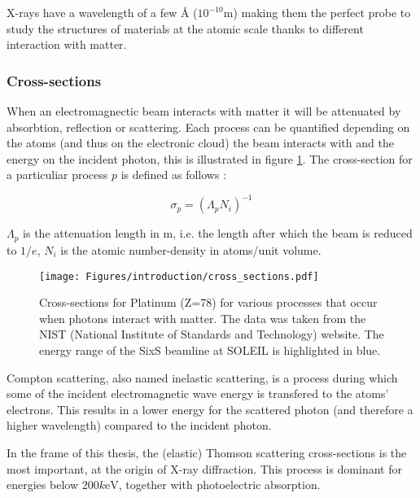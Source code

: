 X-rays have a wavelength of a few \si{\angstrom} ($10^{-10} \si{\meter}$) making them the perfect probe to study the structures of materials at the atomic scale thanks to different interaction with matter.

\subsubsection{Cross-sections}

When an electromagnectic beam interacts with matter it will be attenuated by absorbtion, reflection or scattering.
Each process can be quantified depending on the atoms (and thus on the electronic cloud) the beam interacts with and the energy on the incident photon, this is illustrated in figure \ref{fig:cross_sections}.
The cross-section for a particuliar process $p$ is defined as follows \parencite{Willmott}:

\begin{equation}
	\sigma_p = (\Lambda_p N_i)^{-1}
\end{equation}

$\Lambda_p$ is the attenuation length in \si{\meter}, i.e. the length after which the beam is reduced to $1/e$, $N_i$ is the atomic number-density in atoms/unit volume.

\begin{figure}[!htb]
    \centering
    \texttt{[image: Figures/introduction/cross\_sections.pdf]}
    \caption{Cross-sections for Platinum (Z=78) for various processes that occur when photons interact with matter. The data was taken from the NIST (National Institute of Standards and Technology) \parencite{NIST_cross_sections} website. The energy range of the SixS beamline at SOLEIL is highlighted in blue.}
    \label{fig:cross_sections}
\end{figure}

Compton scattering, also named inelastic scattering, is a process during which some of the incident electromagnetic wave energy is transfered to the atoms' electrons.
This results in a lower energy for the scattered photon (and therefore a higher wavelength) compared to the incident photon.

In the frame of this thesis, the (elastic) Thomson scattering cross-sections is the most important, at the origin of X-ray diffraction.
This process is dominant for energies below $200 \si{k\electronvolt}$, together with photoelectric absorption.%

